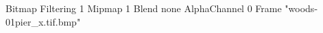 {Bitmap
	{Filtering 1}
	{Mipmap 1}
	{Blend none}
	{AlphaChannel 0}
	{Frame "woods-01pier_x.tif.bmp"}
}
